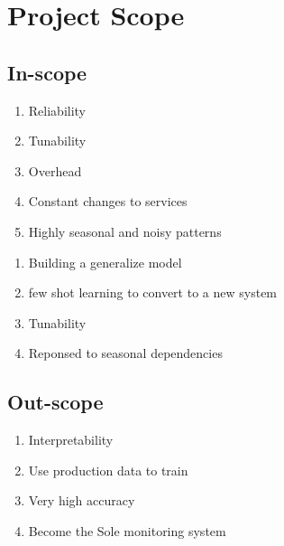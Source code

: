 \section{Project Scope}

\subsection{In-scope}
\begin{enumerate}
\item Reliability
\item Tunability
\item Overhead
\item Constant changes to services
\item Highly seasonal and noisy patterns 
\end{enumerate}
\begin{enumerate}
\item Building a generalize model
\item few shot learning to convert to a new system
\item Tunability
\item Reponsed to seasonal dependencies 
\end{enumerate}



\subsection{Out-scope}
\begin{enumerate}
\item Interpretability
\item Use production data to train
\item Very high accuracy
\item Become the Sole monitoring system
\end{enumerate}

